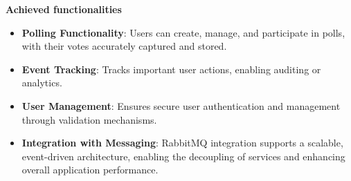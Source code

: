 \vspace{0.5cm}
\noindent \textbf{Achieved functionalities}
\begin{itemize}
    \item \textbf{Polling Functionality}: Users can create, manage, and participate in polls, with their votes accurately captured and stored.
    \item \textbf{Event Tracking}: Tracks important user actions, enabling auditing or analytics.
    \item \textbf{User Management}: Ensures secure user authentication and management through validation mechanisms.
    \item \textbf{Integration with Messaging}: RabbitMQ integration supports a scalable, event-driven architecture, enabling the decoupling of services and enhancing overall application performance.
\end{itemize}